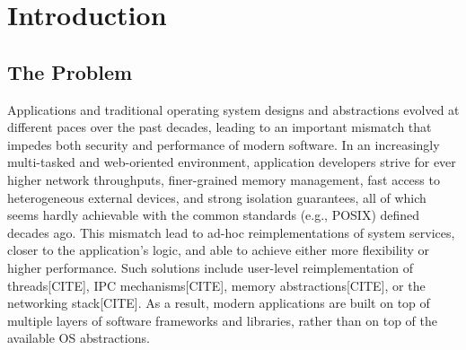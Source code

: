 \section{Introduction}

%	
%	

\subsection{The Problem}

Applications and traditional operating system designs and abstractions evolved at different paces over the past decades, leading to an important mismatch that impedes both security and performance of modern software.
In an increasingly multi-tasked and web-oriented environment, application developers strive for ever higher network throughputs, finer-grained memory management, fast access to heterogeneous external devices, and strong isolation guarantees, all of which seems hardly achievable with the common standards (e.g., POSIX) defined decades ago.
This mismatch lead to ad-hoc reimplementations of system services, closer to the application's logic, and able to achieve either more flexibility or higher performance.
Such solutions include user-level reimplementation of threads[CITE], IPC mechanisms[CITE], memory abstractions[CITE], or the networking stack[CITE].
As a result, modern applications are built on top of multiple layers of software frameworks and libraries, rather than on top of the available OS abstractions.

